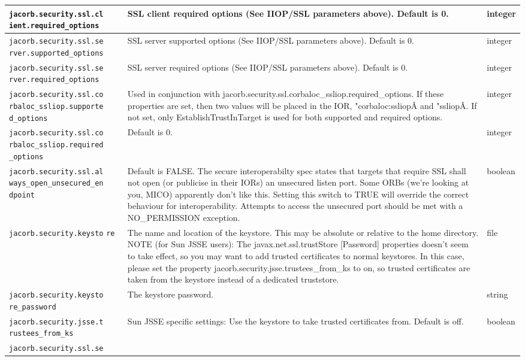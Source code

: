 {{\begin{small}
\begin{longtable}{|p{5cm}|p{9cm}|p{2cm}|}
\hline
\verb"jacorb.security.ssl.cl"
\verb"ient.required_options" & SSL client required options (See IIOP/SSL parameters above). Default is 0. & integer \\
\hline
\verb"jacorb.security.ssl.se"
\verb"rver.supported_options" & SSL server supported options (See IIOP/SSL parameters above). Default is 0. & integer \\
\hline
\verb"jacorb.security.ssl.se"
\verb"rver.required_options" & SSL server required options (See IIOP/SSL parameters above). Default is 0. & integer \\
\hline
\verb"jacorb.security.ssl.co"
\verb"rbaloc_ssliop.supporte"
\verb"d_options" & Used in conjunction with jacorb.security.ssl.corbaloc\_ssliop.required\_options. If these properties are set, then two values will be placed in the IOR, "corbaloc:ssliopÂ and "ssliopÂ. If not set, only EstablishTrustInTarget is used for both supported and required options. & integer \\
\hline
\verb"jacorb.security.ssl.co"
\verb"rbaloc_ssliop.required"
\verb"_options" &  Default is 0. & integer \\
\hline
\verb"jacorb.security.ssl.al"
\verb"ways_open_unsecured_en"
\verb"dpoint" &  Default is FALSE. The secure interoperabilty spec states that targets that require SSL shall not open (or publicise in their IORs) an unsecured listen port. Some ORBs (we're looking at you, MICO) apparently don't like this. Setting this switch to TRUE will override the correct behaviour for interoperability. Attempts to access the unsecured port should be met with a NO\_PERMISSION exception. & boolean \\
\hline
\verb"jacorb.security.keysto"
\verb"re" & The name and location of the keystore. This may be absolute or relative to the home directory. NOTE (for Sun JSSE users): The javax.net.ssl.trustStore [Password] properties doesn't seem to take effect, so you may want to add trusted certificates to normal keystores. In this case, please set the property jacorb.security.jsse.trustees\_from\_ks to on, so trusted certificates are taken from the keystore instead of a dedicated truststore.  & file \\
\hline
\verb"jacorb.security.keysto"
\verb"re_password" & The keystore password. & string \\
\hline
\verb"jacorb.security.jsse.t"
\verb"rustees_from_ks" & Sun JSSE specific settings: Use the keystore to take trusted certificates from. Default is off. & boolean \\
\hline
\verb"jacorb.security.ssl.se"

\end{longtable}
\end{small}}}

